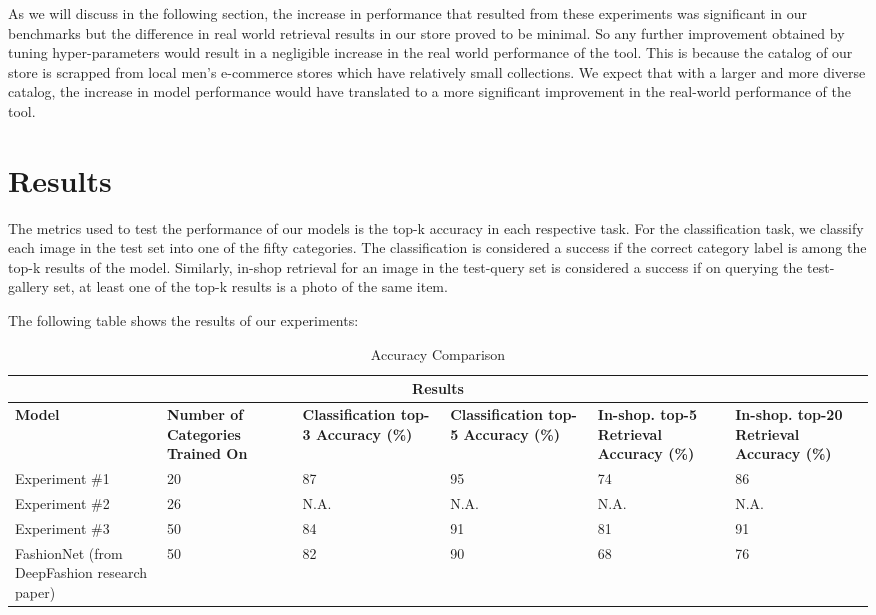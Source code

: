 As we will discuss in the following section, the increase in performance that resulted from these experiments was significant in our benchmarks but the difference in real world retrieval results in our store proved to be minimal. So any further improvement obtained by tuning hyper-parameters would result in a negligible increase in the real world performance of the tool. This is because the catalog of our store is scrapped from local men’s e-commerce stores which have relatively small collections. We expect that with a larger and more diverse catalog, the increase in model performance would have translated to a more significant improvement in the real-world performance of the tool.\\

\section{Results}

The metrics used to test the performance of our models is the top-k accuracy in each respective task. For the classification task, we classify each image in the test set into one of the fifty categories. The classification is considered a success if the correct category label is among the top-k results of the model. Similarly, in-shop retrieval for an image in the test-query set is considered a success if on querying the test-gallery set, at least one of the top-k results is a photo of the same item.\newline

The following table shows the results of our experiments:\\

\begin{table}[H]
\begin{tabular}{ @{}|p{2cm}|p{2cm}|p{2.75cm}|p{2.75cm}|p{2cm}|p{2cm}|  }
 \hline
 \multicolumn{6}{|c|}{\textbf{Results}} \\
 \hline
 \textbf{Model} & \textbf{Number of Categories Trained On} & \textbf{Classification top-3 Accuracy (\%)} & \textbf{Classification top-5 Accuracy (\%)}& \textbf{In-shop. top-5 Retrieval Accuracy (\%)}& \textbf{In-shop. top-20 Retrieval Accuracy (\%)}\\
 
  \hline
 Experiment \#1 & 20 & 87 & 95 & 74 & 86 \\ 
 \hline
 Experiment \#2 & 26 & N.A. & N.A. & N.A. & N.A. \\
 \hline
  Experiment \#3 & 50 & 84 & 91 & 81 & 91 \\
 \hline
 FashionNet (from DeepFashion research paper) & 50 & 82 & 90 & 68 & 76 \\
 \hline
\end{tabular}
\caption{Accuracy Comparison}
\label{table:ML experiment comparison}
\end{table}





